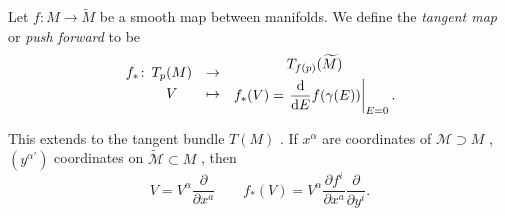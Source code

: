 \begin{definition}
  Let $f \colon M \to \widetilde{M}$  be a smooth map between manifolds.
  We define the \emph{tangent map} or \emph{push forward} to be
  \begin{equation}
    \begin{gathered}
      f_* \colon \\
      \qquad
    \end{gathered}
    \begin{gathered}
      T_p(M) \\
      V
    \end{gathered}
    \quad
    \begin{gathered}
      \to \\
      \mapsto
    \end{gathered}
    \quad
    \begin{gathered}
      T_{f(p)}(\widetilde{M}) \\
      f_*(V) = \left. \dv{E} f(\gamma(E)) \right\rvert_{E=0}.
    \end{gathered}
  \end{equation} 
\end{definition}

This extends to the tangent bundle $T (M)$ .
If $x^{\alpha}$  are coordinates of $\mathcal{M} \supset M$ , $(y^{\alpha'})$  coordinates on $\widetilde{\mathcal{M}} \subset M$ , then
\begin{equation}
  V = V^{\alpha} \frac{\partial }{\partial x^{a}} \qquad f_*(V) = V^{\alpha} \frac{\partial f^i}{\partial x^{a}} \frac{\partial }{\partial y^{i}}.
\end{equation}

